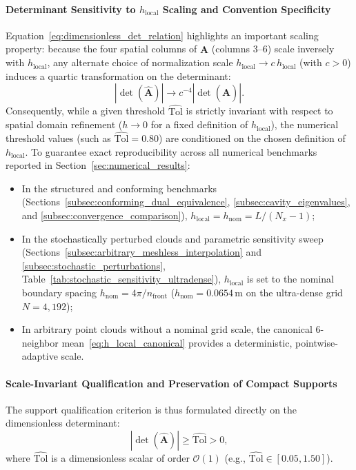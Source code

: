 \documentclass[preprint,12pt]{elsarticle}
\begin{document}
\paragraph{Determinant Sensitivity to $h_{\mathrm{local}}$ Scaling and Convention Specificity}
Equation~\eqref{eq:dimensionless_det_relation} highlights an important scaling property: because the four spatial columns of $\widehat{\mathbf{A}}$ (columns 3--6) scale inversely with $h_{\mathrm{local}}$, any alternate choice of normalization scale $h_{\mathrm{local}} \to c \, h_{\mathrm{local}}$ (with $c > 0$) induces a quartic transformation on the determinant:
\begin{equation}
|\det(\widehat{\mathbf{A}})| \longrightarrow c^{-4} |\det(\widehat{\mathbf{A}})|.
\label{eq:quartic_h_local_scaling}
\end{equation}
Consequently, while a given threshold $\widehat{\mathrm{Tol}}$ is strictly invariant with respect to spatial domain refinement ($h \to 0$ for a fixed definition of $h_{\mathrm{local}}$), the numerical threshold values (such as $\widehat{\mathrm{Tol}} = 0.80$) are conditioned on the chosen definition of $h_{\mathrm{local}}$. To guarantee exact reproducibility across all numerical benchmarks reported in Section~\ref{sec:numerical_results}:
\begin{itemize}
    \item In the structured and conforming benchmarks (Sections~\ref{subsec:conforming_dual_equivalence}, \ref{subsec:cavity_eigenvalues}, and \ref{subsec:convergence_comparison}), $h_{\mathrm{local}} = h_{\mathrm{nom}} = L / (N_x - 1)$;
    \item In the stochastically perturbed clouds and parametric sensitivity sweep (Sections~\ref{subsec:arbitrary_meshless_interpolation} and \ref{subsec:stochastic_perturbations}, Table~\ref{tab:stochastic_sensitivity_ultradense}), $h_{\mathrm{local}}$ is set to the nominal boundary spacing $h_{\mathrm{nom}} = 4\pi / n_{\mathrm{front}}$ ($h_{\mathrm{nom}} = 0.0654$\,m on the ultra-dense grid $N = 4{,}192$);
    \item In arbitrary point clouds without a nominal grid scale, the canonical 6-neighbor mean~\eqref{eq:h_local_canonical} provides a deterministic, pointwise-adaptive scale.
\end{itemize}

\paragraph{Scale-Invariant Qualification and Preservation of Compact Supports}
The support qualification criterion is thus formulated directly on the dimensionless determinant:
\begin{equation}
|\det(\widehat{\mathbf{A}})| \ge \widehat{\mathrm{Tol}} > 0,
\label{eq:dimensionless_threshold_criterion}
\end{equation}
where $\widehat{\mathrm{Tol}}$ is a dimensionless scalar of order $\mathcal{O}(1)$ (e.g., $\widehat{\mathrm{Tol}} \in [0.05, 1.50]$). 
\end{document}
